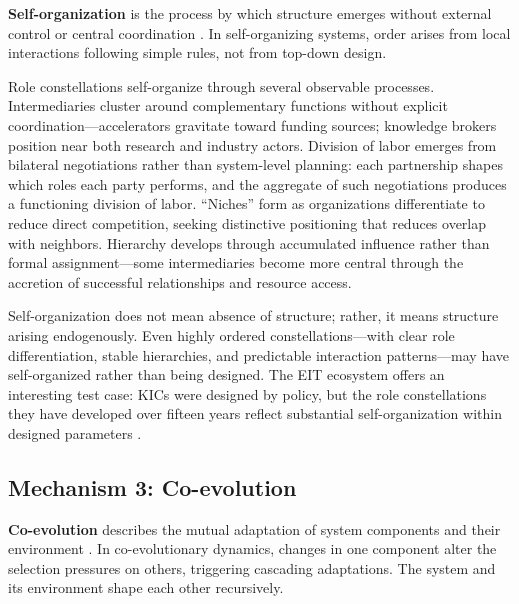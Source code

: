\documentclass[../main.tex]{subfiles}
\begin{document}
\textbf{Self-organization} is the process by which structure emerges without external control or central coordination \cite{kauffman1993origins}. In self-organizing systems, order arises from local interactions following simple rules, not from top-down design.

Role constellations self-organize through several observable processes. Intermediaries cluster around complementary functions without explicit coordination---accelerators gravitate toward funding sources; knowledge brokers position near both research and industry actors. Division of labor emerges from bilateral negotiations rather than system-level planning: each partnership shapes which roles each party performs, and the aggregate of such negotiations produces a functioning division of labor. ``Niches'' form as organizations differentiate to reduce direct competition, seeking distinctive positioning that reduces overlap with neighbors. Hierarchy develops through accumulated influence rather than formal assignment---some intermediaries become more central through the accretion of successful relationships and resource access.

Self-organization does not mean absence of structure; rather, it means structure arising endogenously. Even highly ordered constellations---with clear role differentiation, stable hierarchies, and predictable interaction patterns---may have self-organized rather than being designed. The EIT ecosystem offers an interesting test case: KICs were designed by policy, but the role constellations they have developed over fifteen years reflect substantial self-organization within designed parameters \cite{peltoniemi2006preliminary}.

\subsection{Mechanism 3: Co-evolution}

\textbf{Co-evolution} describes the mutual adaptation of system components and their environment \cite{kauffman1991coevolution}. In co-evolutionary dynamics, changes in one component alter the selection pressures on others, triggering cascading adaptations. The system and its environment shape each other recursively.
\end{document}

